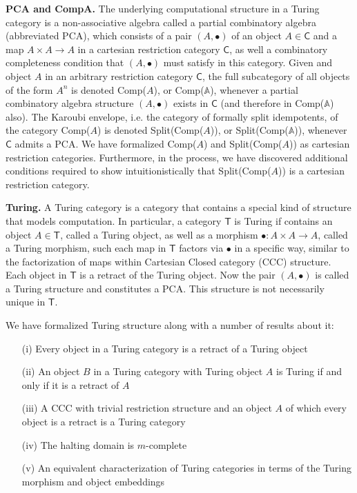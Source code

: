\documentclass{entcs} \usepackage{entcsmacro}
\begin{document}
{\bfseries PCA and CompA.} The underlying computational structure in a Turing category is a non-associative algebra called a partial combinatory algebra (abbreviated PCA), which consists of a pair $(A, \bullet)$ of an object $A \in \mathsf{C}$ and a map $A \times A \to A$ in a cartesian restriction category $\mathsf{C}$, as well a combinatory completeness condition that $(A, \bullet)$ must satisfy in this category. Given and object $A$ in an arbitrary restriction category $\mathsf{C}$, the full subcategory of all objects of the form $A^n$ is denoted Comp($A$), or Comp($\mathbb{A}$), whenever a partial combinatory algebra structure $(A, \bullet)$ exists in $\mathsf{C}$ (and therefore in Comp($\mathbb{A}$) also). The Karoubi envelope, i.e. the category of formally split idempotents, of the category Comp($A$) is denoted Split(Comp($A$)), or Split(Comp($\mathbb{A}$)), whenever $\mathsf{C}$ admits a PCA. We have formalized Comp($A$) and Split(Comp($A$)) as cartesian restriction categories. Furthermore, in the process, we have discovered additional conditions required to show intuitionistically that Split(Comp($A$)) is a cartesian restriction category. 

{\bfseries Turing.} A Turing category is a category that contains a special kind of structure that models computation. In particular, a category $\mathsf{T}$ is Turing if contains an object $A \in \mathsf{T}$, called a Turing object, as well as a morphism $\bullet : A \times A \to A$, called a Turing morphism, such each map in $\mathsf{T}$ factors via $\bullet$ in a specific way, similar to the factorization of maps within Cartesian Closed category (CCC) structure. Each object in $\mathsf{T}$ is a retract of the Turing object. Now the pair $(A, \bullet)$ is called a Turing structure and constitutes a PCA. This structure is not necessarily unique in $\mathsf{T}$.

We have formalized Turing structure along with a number of results about it:

\begin{itemize}
	\item[(i)] Every object in a Turing category is a retract of a Turing object~\cite{Turing}
	\item[(ii)] An object $B$ in a Turing category with Turing object $A$ is Turing if and only if it is a retract of $A$~\cite{Turing}
	
	\item[(iii)] A CCC with trivial restriction structure and an object $A$ of which every object is a retract is a Turing category
	\item[(iv)] The halting domain is $m$-complete~\cite{Turing}
	
	\item[(v)] An equivalent characterization of Turing categories in terms of the Turing morphism and object embeddings~\cite{Turing}
	
\end{itemize}
\end{document}
